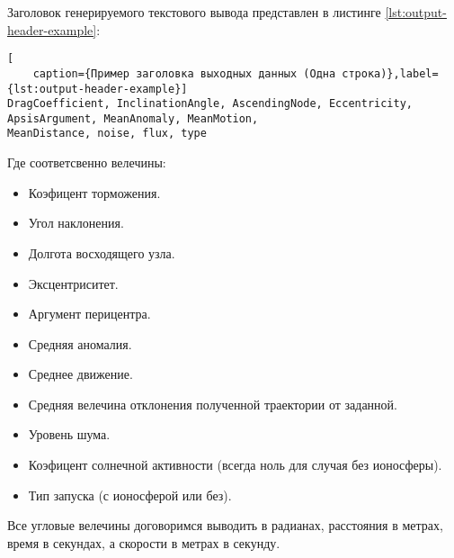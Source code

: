 Заголовок генерируемого текстового вывода представлен в листинге \ref{lst:output-header-example}:
\begin{lstlisting}[
	caption={Пример заголовка выходных данных (Одна строка)},label={lst:output-header-example}]
DragCoefficient, InclinationAngle, AscendingNode, Eccentricity, ApsisArgument, MeanAnomaly, MeanMotion,
MeanDistance, noise, flux, type
\end{lstlisting}
Где соответсвенно велечины:
\begin{itemize}
	\item Коэфицент торможения.
	\item Угол наклонения.
	\item Долгота восходящего узла.
	\item Эксцентриситет.
	\item Аргумент перицентра.
	\item Средняя аномалия.
	\item Среднее движение.
	\item Средняя велечина отклонения полученной траектории от заданной.
	\item Уровень шума.
	\item Коэфицент солнечной активности (всегда ноль для случая без ионосферы).
	\item Тип запуска (с ионосферой или без).
\end{itemize}

Все угловые велечины договоримся выводить в радианах, расстояния в метрах, время в секундах, а скорости в метрах в
секунду.
